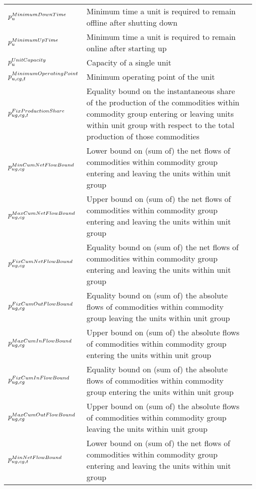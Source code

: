 \begin{longtable}{p{\cola} p{\colc} >{\small\raggedleft\arraybackslash\itshape}p{\colb}}
		$p^{MinimumDownTime}_{u}$	& Minimum time a unit is required to remain offline after shutting down	&                \\
		$p^{MinimumUpTime}_{u}$	& Minimum time a unit is required to remain online after starting up	&                \\
		$p^{UnitCapacity}_{u} $	& Capacity of a single unit                                   	&                \\
		$p^{MinimumOperatingPoint}_{u,cg,t}$	& Minimum operating point of the unit                         	&                \\
		$p^{FixProductionShare}_{ug,cg,t}$	& Equality bound on the instantaneous share of the production of the commodities within commodity group \commoditygroup entering or leaving units within unit group \unitgroup with respect to the total production of those commodities	&                \\
		$p^{MinCumNetFlowBound}_{ug,cg}$	& Lower bound on (sum of) the net flows of commodities within commodity group \commoditygroup entering and leaving the units within unit group \unitgroup 	&                \\
		$p^{MaxCumNetFlowBound}_{ug,cg}$	& Upper bound on (sum of) the net flows of commodities within commodity group \commoditygroup entering and leaving the units within unit group \unitgroup 	&                \\
		$p^{FixCumNetFlowBound}_{ug,cg}$	& Equality bound on (sum of) the net flows of commodities within commodity group \commoditygroup entering and leaving the units within unit group \unitgroup 	&                \\
		$p^{FixCumOutFlowBound}_{ug,cg}$	& Equality bound on (sum of) the absolute flows of commodities within commodity group \commoditygroup leaving the units within unit group \unitgroup 	&                \\
		$p^{MaxCumInFlowBound}_{ug,cg}$	& Upper bound on (sum of) the absolute flows of commodities within commodity group \commoditygroup entering the units within unit group \unitgroup 	&                \\
		$p^{FixCumInFlowBound}_{ug,cg}$	& Equality bound on (sum of) the absolute flows of commodities within commodity group \commoditygroup entering the units within unit group \unitgroup 	&                \\
		$p^{MaxCumOutFlowBound}_{ug,cg}$	& Upper bound on (sum of) the absolute flows of commodities within commodity group \commoditygroup leaving the units within unit group \unitgroup 	&                \\
		$p^{MinNetFlowBound}_{ug,cg,t}$	& Lower bound on (sum of) the net flows of commodities within commodity group \commoditygroup entering and leaving the units within unit group \unitgroup 	&                \\

\end{longtable}
